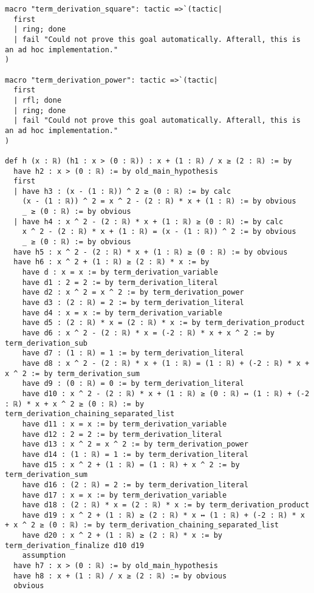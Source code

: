 \documentclass{article}
\begin{document}
\begin{tcolorbox}[colback=white!10, width=\linewidth]
\begin{lstlisting}[language=Lean4]
macro "term_derivation_square": tactic =>`(tactic|
  first
  | ring; done
  | fail "Could not prove this goal automatically. Afterall, this is an ad hoc implementation."
)

macro "term_derivation_power": tactic =>`(tactic|
  first
  | rfl; done
  | ring; done
  | fail "Could not prove this goal automatically. Afterall, this is an ad hoc implementation."
)

def h (x : ℝ) (h1 : x > (0 : ℝ)) : x + (1 : ℝ) / x ≥ (2 : ℝ) := by
  have h2 : x > (0 : ℝ) := by old_main_hypothesis
  first
  | have h3 : (x - (1 : ℝ)) ^ 2 ≥ (0 : ℝ) := by calc
    (x - (1 : ℝ)) ^ 2 = x ^ 2 - (2 : ℝ) * x + (1 : ℝ) := by obvious
    _ ≥ (0 : ℝ) := by obvious
  | have h4 : x ^ 2 - (2 : ℝ) * x + (1 : ℝ) ≥ (0 : ℝ) := by calc
    x ^ 2 - (2 : ℝ) * x + (1 : ℝ) = (x - (1 : ℝ)) ^ 2 := by obvious
    _ ≥ (0 : ℝ) := by obvious
  have h5 : x ^ 2 - (2 : ℝ) * x + (1 : ℝ) ≥ (0 : ℝ) := by obvious
  have h6 : x ^ 2 + (1 : ℝ) ≥ (2 : ℝ) * x := by
    have d : x = x := by term_derivation_variable
    have d1 : 2 = 2 := by term_derivation_literal
    have d2 : x ^ 2 = x ^ 2 := by term_derivation_power
    have d3 : (2 : ℝ) = 2 := by term_derivation_literal
    have d4 : x = x := by term_derivation_variable
    have d5 : (2 : ℝ) * x = (2 : ℝ) * x := by term_derivation_product
    have d6 : x ^ 2 - (2 : ℝ) * x = (-2 : ℝ) * x + x ^ 2 := by term_derivation_sub
    have d7 : (1 : ℝ) = 1 := by term_derivation_literal
    have d8 : x ^ 2 - (2 : ℝ) * x + (1 : ℝ) = (1 : ℝ) + (-2 : ℝ) * x + x ^ 2 := by term_derivation_sum
    have d9 : (0 : ℝ) = 0 := by term_derivation_literal
    have d10 : x ^ 2 - (2 : ℝ) * x + (1 : ℝ) ≥ (0 : ℝ) ↔ (1 : ℝ) + (-2 : ℝ) * x + x ^ 2 ≥ (0 : ℝ) := by term_derivation_chaining_separated_list
    have d11 : x = x := by term_derivation_variable
    have d12 : 2 = 2 := by term_derivation_literal
    have d13 : x ^ 2 = x ^ 2 := by term_derivation_power
    have d14 : (1 : ℝ) = 1 := by term_derivation_literal
    have d15 : x ^ 2 + (1 : ℝ) = (1 : ℝ) + x ^ 2 := by term_derivation_sum
    have d16 : (2 : ℝ) = 2 := by term_derivation_literal
    have d17 : x = x := by term_derivation_variable
    have d18 : (2 : ℝ) * x = (2 : ℝ) * x := by term_derivation_product
    have d19 : x ^ 2 + (1 : ℝ) ≥ (2 : ℝ) * x ↔ (1 : ℝ) + (-2 : ℝ) * x + x ^ 2 ≥ (0 : ℝ) := by term_derivation_chaining_separated_list
    have d20 : x ^ 2 + (1 : ℝ) ≥ (2 : ℝ) * x := by term_derivation_finalize d10 d19
    assumption
  have h7 : x > (0 : ℝ) := by old_main_hypothesis
  have h8 : x + (1 : ℝ) / x ≥ (2 : ℝ) := by obvious
  obvious

\end{lstlisting}
\end{tcolorbox}
\end{document}
